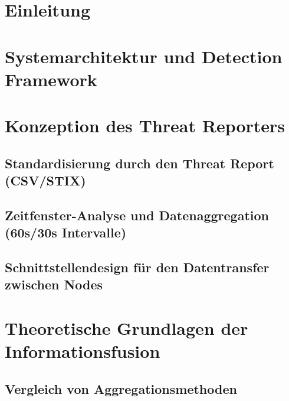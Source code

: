 \newpage

\section{Einleitung}
    
    
    

\newpage

\section{Systemarchitektur und Detection Framework}
\label{sec:systemarchitektur}
    
    
    

\newpage

\section{Konzeption des Threat Reporters}
    \subsection{Standardisierung durch den Threat Report (CSV/STIX)}
    \subsection{Zeitfenster-Analyse und Datenaggregation (60s/30s Intervalle)}
    \subsection{Schnittstellendesign für den Datentransfer zwischen Nodes}

\newpage

\section{Theoretische Grundlagen der Informationsfusion}
    \subsection{Vergleich von Aggregationsmethoden}
